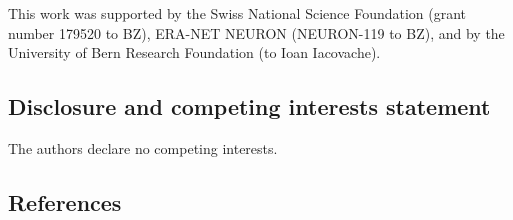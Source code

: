 This work was supported by the Swiss National Science Foundation (grant number 179520 to BZ), ERA-NET NEURON (NEURON-119 to BZ), and by the University of Bern Research Foundation (to Ioan Iacovache).

\hypertarget{disclosure-and-competing-interests-statement}{%
\subsection{Disclosure and competing interests statement}\label{disclosure-and-competing-interests-statement}}

The authors declare no competing interests.

\hypertarget{references}{%
\subsection{References}\label{references}}

